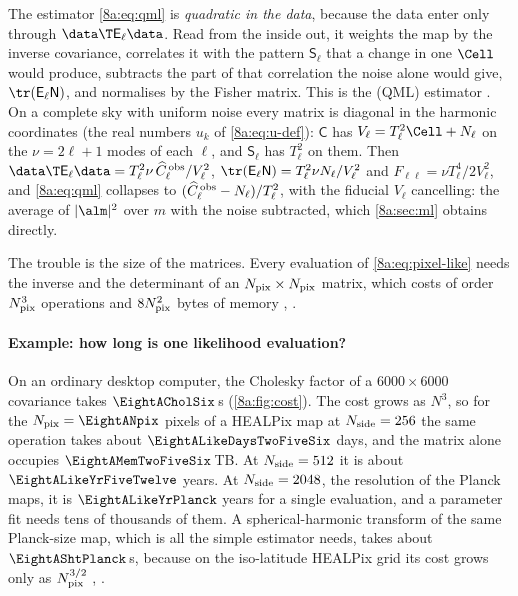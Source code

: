 The estimator \eqref{8a:eq:qml} is \emph{quadratic in the data}, because the data enter only
through $\data\T\mathsf E_\ell\data$. Read from the inside out, it weights the map by the inverse
covariance, correlates it with the pattern $\mathsf S_\ell$ that a change in one $\Cell$ would
produce, subtracts the part of that correlation the noise alone would give, $\tr(\mathsf E_\ell\mathsf N)$,
and normalises by the Fisher matrix. This is the  (QML) estimator
\cite{Efstathiou2004}. On a complete sky with uniform noise every matrix is diagonal in the
harmonic coordinates (the real numbers $u_k$ of \eqref{8a:eq:u-def}): $\mathsf C$ has $V_\ell=T_\ell^2\Cell+N_\ell$ on the $\nu=2\ell+1$ modes of each $\ell$,
and $\mathsf S_\ell$ has $T_\ell^2$ on them. Then $\data\T\mathsf E_\ell\data=T_\ell^2\nu\,\widehat C^{\,\rm obs}_\ell/V_\ell^2$,
$\tr(\mathsf E_\ell\mathsf N)=T_\ell^2\nu N_\ell/V_\ell^2$ and $F_{\ell\ell}=\nu T_\ell^4/2V_\ell^2$, and
\eqref{8a:eq:qml} collapses to $(\widehat C^{\,\rm obs}_\ell-N_\ell)/T_\ell^2$, with the fiducial
$V_\ell$ cancelling: the average of
$|\alm|^2$ over $m$ with the noise subtracted, which \cref{8a:sec:ml} obtains directly.

The trouble is the size of the matrices. Every evaluation of \eqref{8a:eq:pixel-like} needs
the inverse and the determinant of an $N_{\rm pix}\times N_{\rm pix}$ matrix, which costs of
order $N_{\rm pix}^3$ operations and $8N_{\rm pix}^2$ bytes of memory
, .

\paragraph{Example: how long is one likelihood evaluation?}
On an ordinary desktop computer, the Cholesky factor of a $6000\times6000$
covariance takes $\EightACholSix$\,s (\cref{8a:fig:cost}). The cost grows as $N^3$, so for
the $N_{\rm pix}=\EightANpix$ pixels of a HEALPix map at $N_{\rm side}=256$ the same operation
takes about $\EightALikeDaysTwoFiveSix$ days, and the matrix alone occupies
$\EightAMemTwoFiveSix$\,TB. At $N_{\rm side}=512$ it is about $\EightALikeYrFiveTwelve$
years. At $N_{\rm side}=2048$, the resolution of the Planck maps, it is
$\EightALikeYrPlanck$ years for a single evaluation, and a parameter fit needs tens of
thousands of them. A spherical-harmonic transform of the same Planck-size map, which is all
the simple estimator needs, takes about $\EightAShtPlanck$\,s, because on the iso-latitude
HEALPix grid its cost grows only as $N_{\rm pix}^{3/2}$ ,
\cite{Gorski2005}.


